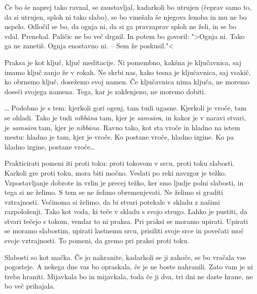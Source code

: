 Če bo še naprej tako ravnal, se zaustavljal, kadarkoli bo utrujen (čeprav samo to, da si utrujen, sploh ni tako slabo), se bo vmešala še njegova lenoba in mu ne bo uspelo. Odločil se bo, da ognja ni, da si ga pravzaprav sploh ne želi, in se bo vdal. Prenehal. Paličic ne bo več drgnil. In potem bo govoril: ">Ognja ni. Tako ga ne zanetiš. Ognja enostavno ni. – Sem že poskusil."<

\vspace{-2.5\baselineskip}
\vspace{-0.5\baselineskip}

Praksa je kot ključ, ključ meditacije. Ni pomembno, kakšna je ključavnica, saj imamo ključ zanjo že v rokah. Ne skrbi nas, kako tesna je ključavnica, saj vsakič, ko obrnemo ključ, dosežemo svoj namen. Če ključavnica nima ključa, ne moremo doseči svojega namena. Tega, kar je zaklenjeno, ne moremo dobiti.

\clearpage


\ldots{} Podobno je s tem: kjerkoli gori ogenj, tam tudi ugasne. Kjerkoli je vroče, tam se ohladi. Tako je tudi \emph{nibbāna} tam, kjer je \emph{samsāra}, in kakor je v naravi stvari, je \emph{samsāra }tam, kjer je \emph{nibbāna}. Ravno tako, kot sta vroče in hladno na istem mestu: hladno je tam, kjer je vroče. Ko postane vroče, hladno izgine. Ko pa hladno izgine, postane vroče\ldots{}


Prakticirati pomeni iti proti toku: proti tokovom v srcu, proti toku slabosti. Karkoli gre proti toku, mora biti močno. Veslati po reki navzgor je težko. Vzpostavljanje dobrote in vrlin je precej težko, ker smo ljudje polni slabosti, in tega si ne želimo. S tem se ne želimo obremenjevati. Ne želimo si graditi vztrajnosti. Večinoma si želimo, da bi stvari potekale v skladu z našimi razpoloženji. Tako kot voda, ki teče v skladu s svojo strugo. Lahko je pustiti, da stvari tečejo s tokom, vendar to ni praksa. Pri praksi se moramo upirati. Upirati se moramo slabostim, upirati lastnemu srcu, prisiliti svoje srce in povečati moč svoje vztrajnosti. To pomeni, da gremo pri praksi proti toku.

\clearpage


Slabosti so kot mačka. Če jo nahranite, kadarkoli se ji zahoče, se bo vračala vse pogosteje. A nekega dne vas bo opraskala, če je ne boste nahranili. Zato vam je ni treba hraniti. Mijavkala bo in mijavkala, toda če ji dva, tri dni ne daste hrane, ne bo več prihajala.

